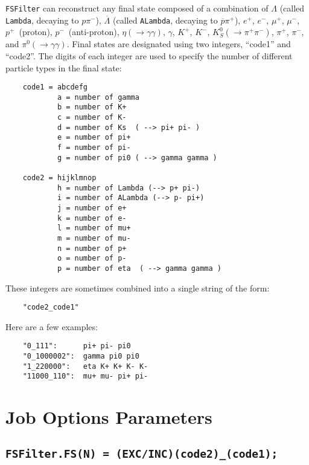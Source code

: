 \documentclass[11pt]{article}
\begin{document}
{\tt FSFilter} can reconstruct any final state composed of a combination of $\Lambda$ (called {\tt Lambda}, decaying to $p\pi^-$), $\overline\Lambda$ (called {\tt ALambda}, decaying to $\overline{p}\pi^+$), $e^+$, $e^-$, $\mu^+$, $\mu^-$, $p^+$~(proton), $p^-$~(anti-proton), $\eta(\to\gamma\gamma)$, $\gamma$, $K^+$, $K^-$, $K^0_S(\to\pi^+\pi^-)$, $\pi^+$, $\pi^-$, and $\pi^0(\to\gamma\gamma)$.  Final states are designated using two integers, ``code1'' and ``code2''.  The digits of each integer are used to specify the number of different particle types in the final state:
\begin{verbatim}
    code1 = abcdefg
            a = number of gamma
            b = number of K+ 
            c = number of K- 
            d = number of Ks  ( --> pi+ pi- )
            e = number of pi+ 
            f = number of pi- 
            g = number of pi0 ( --> gamma gamma )

    code2 = hijklmnop
            h = number of Lambda (--> p+ pi-)
            i = number of ALambda (--> p- pi+)
            j = number of e+
            k = number of e- 
            l = number of mu+ 
            m = number of mu-
            n = number of p+ 
            o = number of p- 
            p = number of eta  ( --> gamma gamma )
\end{verbatim}
These integers are sometimes combined into a single string of the form:
\begin{verbatim}
    "code2_code1"
\end{verbatim}
Here are a few examples:
\begin{verbatim}
    "0_111":      pi+ pi- pi0
    "0_1000002":  gamma pi0 pi0
    "1_220000":   eta K+ K+ K- K-
    "11000_110":  mu+ mu- pi+ pi-
\end{verbatim}


\section{Job Options Parameters}
\label{sec:parameters}

\subsection{\tt FSFilter.FS(N) = (EXC/INC)(code2)\_(code1);}
\end{document}
